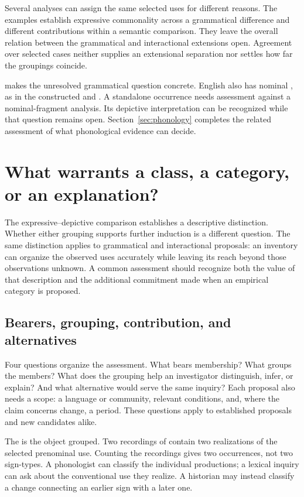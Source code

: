 \documentclass[12pt]{article}
\begin{document}
Several analyses can assign the same selected uses for different reasons.
The examples establish expressive commonality across a grammatical
difference and different contributions within a semantic comparison.
They leave the overall relation between the grammatical and interactional
extensions open. Agreement over selected cases neither supplies an
extensional separation nor settles how far the groupings coincide.

 makes the unresolved grammatical question concrete.
English also has nominal , as in the constructed
 and . A standalone occurrence
needs assessment against a nominal-fragment analysis.
Its depictive interpretation can be recognized while that question remains
open. Section~\ref{sec:phonology} completes the related assessment of
what phonological evidence can decide.

\section{What warrants a class, a category, or an explanation?}\label{sec:assessment}

The expressive--depictive comparison establishes a descriptive distinction.
Whether either grouping supports further induction is a different question.
The same distinction applies to grammatical and interactional proposals:
an inventory can organize the observed uses accurately while leaving
its reach beyond those observations unknown. A common assessment should
recognize both the value of that description and the additional commitment
made when an empirical category is proposed.

\subsection{Bearers, grouping, contribution, and alternatives}

Four questions organize the assessment. What bears membership? What groups
the members? What does the grouping help an investigator distinguish,
infer, or explain? And what alternative would serve the same inquiry?
Each proposal also needs a scope: a language or community, relevant
conditions, and, where the claim concerns change, a period. These
questions apply to established proposals and new candidates alike.

The  is the object grouped. Two recordings of  contain two realizations of the selected prenominal
 use. Counting the recordings gives two occurrences, not
two sign-types. A phonologist can classify the individual productions;
a lexical inquiry can ask about the conventional use they realize.
A historian may instead classify a change connecting an earlier sign
with a later one.
\end{document}
